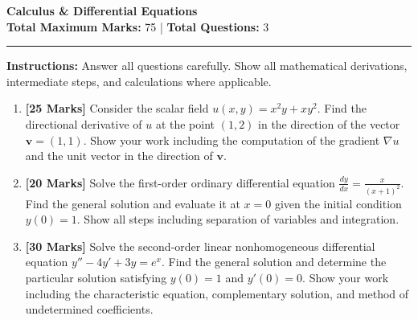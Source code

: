 \documentclass[11pt,a4paper]{article}
\begin{document}
\begin{center}
    {\LARGE \textbf{ Calculus & Differential Equations }} \\[0.5em]
    \textbf{Total Maximum Marks:} 75 \quad | \quad \textbf{Total Questions:} 3
\end{center}

\vspace{1em}
\hrule
\vspace{1.5em}

\noindent \textbf{Instructions:} Answer all questions carefully. Show all mathematical derivations, intermediate steps, and calculations where applicable.

\vspace{1.5em}

\begin{enumerate}[label=\textbf{Q\arabic*.}, leftmargin=2em]

    \item \textbf{[25 Marks]} Consider the scalar field $u(x,y) = x^2 y + x y^2$. Find the directional derivative of $u$ at the point $(1,2)$ in the direction of the vector $\mathbf{v} = (1,1)$. Show your work including the computation of the gradient $\nabla u$ and the unit vector in the direction of $\mathbf{v}$.
    
    \vspace{1em}

    \item \textbf{[20 Marks]} Solve the first-order ordinary differential equation $\frac{dy}{dx} = \frac{x}{(x+1)^2}$. Find the general solution and evaluate it at $x=0$ given the initial condition $y(0)=1$. Show all steps including separation of variables and integration.
    
    \vspace{1em}

    \item \textbf{[30 Marks]} Solve the second-order linear nonhomogeneous differential equation $y'' - 4y' + 3y = e^x$. Find the general solution and determine the particular solution satisfying $y(0)=1$ and $y'(0)=0$. Show your work including the characteristic equation, complementary solution, and method of undetermined coefficients.
    
    \vspace{1em}

\end{enumerate}
\end{document}
